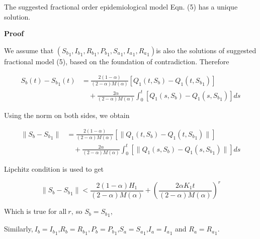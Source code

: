 \documentclass[10pt]{NSP1}
\begin{document}
The suggested fractional order epidemiological model Eqn. (5) has a unique solution.



\textbf{Proof}

We assume that \(\left( {S_{b}}_{1},{I_{b}}_{1},{R_{b}}_{1},{P_{b}}_{1},{S_{a}}_{1},{I_{a}}_{1},{R_{a}}_{1} \right)\)is also the solutions of suggested fractional model (5), based on the foundation of contradiction. Therefore


\begin{equation}
\begin{aligned}
S_{b}(t) - {S_{b}}_{1}(t) &= \frac{2(1 - \alpha)}{(2 - \alpha)M(\alpha)}\left\lbrack Q_{1}\left( t,S_{b} \right) - Q_{1}\left( t,{S_{b}}_{1} \right) \right\rbrack \\
&\quad + \frac{2\alpha}{(2 - \alpha)M(\alpha)}\int_{0}^{t}{}\left\lbrack Q_{1}\left( s,S_{b} \right) - Q_{1}\left( s,{S_{b}}_{1} \right) \right\rbrack ds
\end{aligned}
\end{equation}


Using the norm on both sides, we obtain



\begin{equation}
\begin{aligned}
\| S_{b} - {S_{b}}_{1}\| &= \frac{2(1 - \alpha)}{(2 - \alpha)M(\alpha)}\left\lbrack \| Q_{1}\left( t,S_{b} \right) - Q_{1}\left( t,{S_{b}}_{1} \right)\| \right\rbrack \\
&\quad + \frac{2\alpha}{(2 - \alpha)M(\alpha)}\int_{0}^{t}{}\left\lbrack \| Q_{1}\left( s,S_{b} \right) - Q_{1}\left( s,{S_{b}}_{1} \right)\| \right\rbrack ds
\end{aligned}
\end{equation}


Lipchitz condition is used to get




\begin{equation}
\| S_{b} - {S_{b}}_{1}\| < \frac{2(1 - \alpha)H_{1}}{(2 - \alpha)M(\alpha)} + \left( \frac{2\alpha K_{1}t}{(2 - \alpha)M(\alpha)} \right)^{r}
\end{equation}


Which is true for all\(\ r,\ \)so \(S_{b} = {S_{b}}_{1}\),


Similarly,\(\ I_{b} = {I_{b}}_{1}\),\(R_{b} = {R_{b}}_{1},P_{b} = {P_{b}}_{1}\),\(S_{a} = {S_{a}}_{1}\),\(I_{a} = {I_{a}}_{1}\) and \(R_{a} = {R_{a}}_{1}\).
\end{document}
